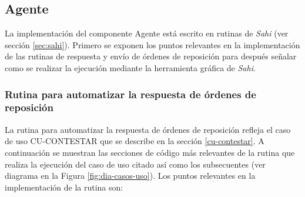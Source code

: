 \subsection{Agente}\label{sec:agente}
La implementación del componente Agente está escrito en rutinas de \textit{Sahi} (ver sección \ref{sec:sahi}). Primero se exponen los puntos relevantes en la implementación de las rutinas de respuesta y envío de órdenes de reposición para después señalar como se realizar la ejecución mediante la herramienta gráfica de \textit{Sahi}.

\subsubsection{Rutina para automatizar la respuesta de órdenes de reposición}\label{sec:aut-contestar}
La rutina para automatizar la respuesta de órdenes de reposición refleja el caso de uso  CU-CONTESTAR que se describe en la sección \ref{cu-contestar}. A continuación se muestran las secciones de código más relevantes de la rutina que realiza la ejecución del caso de uso citado así como los subsecuentes (ver diagrama en la Figura \ref{fig:dia-casos-uso}). Los puntos relevantes en la implementación de la rutina son:

